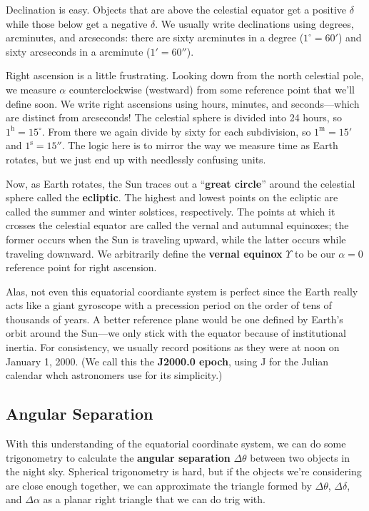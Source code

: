 \documentclass[../a062main.tex]{subfiles}
\begin{document}
Declination is easy.
Objects that are above the celestial equator get a positive $\delta$ while those below get a negative $\delta$.
We usually write declinations using degrees, arcminutes, and arcseconds: there are sixty arcminutes in a degree ($1^\circ = 60'$) and sixty arcseconds in a arcminute ($1' = 60''$).

Right ascension is a little frustrating.
Looking down from the north celestial pole, we measure $\alpha$ counterclockwise (westward) from some reference point that we'll define soon.
We write right ascensions using hours, minutes, and seconds---which are distinct from arcseconds!
The celestial sphere is divided into 24 hours, so $1^\text{h} = 15^\circ$.
From there we again divide by sixty for each subdivision, so $1^\text{m} = 15'$ and $1^\text{s} = 15''$.
The logic here is to mirror the way we measure time as Earth rotates, but we just end up with needlessly confusing units.

Now, as Earth rotates, the Sun traces out a ``\textbf{great circle}'' around the celestial sphere called the \textbf{ecliptic}.
The highest and lowest points on the ecliptic are called the summer and winter solstices, respectively.
The points at which it crosses the celestial equator are called the vernal and autumnal equinoxes; the former occurs when the Sun is traveling upward, while the latter occurs while traveling downward.
We arbitrarily define the \textbf{vernal equinox} $\Upsilon$ to be our $\alpha = 0$ reference point for right ascension.

Alas, not even this equatorial coordiante system is perfect since the Earth really acts like a giant gyroscope with a precession period on the order of tens of thousands of years.
A better reference plane would be one defined by Earth's orbit around the Sun---we only stick with the equator because of institutional inertia.
For consistency, we usually record positions as they were at noon on January 1, 2000.
(We call this the \textbf{J2000.0 epoch}, using J for the Julian calendar whch astronomers use for its simplicity.)

\subsection*{Angular Separation}
With this understanding of the equatorial coordinate system, we can do some trigonometry to calculate the \textbf{angular separation} $\Delta \theta$ between two objects in the night sky.
Spherical trigonometry is hard, but if the objects we're considering are close enough together, we can approximate the triangle formed by $\Delta \theta$, $\Delta \delta$, and $\Delta \alpha$ as a planar right triangle that we can do trig with.
\end{document}
